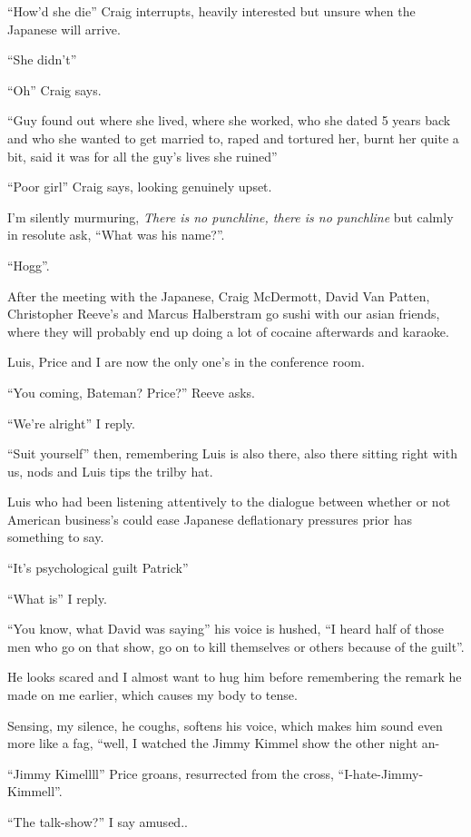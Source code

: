 \documentclass[19pt,openany]{book}
\begin{document}
``How'd she die'' Craig interrupts, heavily
interested but unsure when the Japanese
will arrive.

``She didn't''

``Oh'' Craig says.

``Guy found out where she lived,
where she worked, who she dated 5 years back
and who she wanted to get married to, raped
and tortured her, burnt her quite a bit,
said it was for all the guy's lives she
ruined''

``Poor girl'' Craig says, looking genuinely
upset.

I'm silently murmuring, \textit{There is no punchline, there is no punchline}
but calmly in resolute
ask, ``What was his name?''.

``Hogg''.

After the meeting with the Japanese, Craig
McDermott, David Van Patten, Christopher
Reeve's and Marcus Halberstram go sushi
with our asian friends, where they
will probably end up doing a lot of cocaine
afterwards and karaoke.

Luis, Price and I are now the only one's
in the conference room.

``You coming, Bateman? Price?'' Reeve asks.

``We're alright'' I reply.

``Suit yourself'' then, remembering Luis
is also there, also there sitting
right with us, nods and Luis tips the trilby hat.

Luis who had been listening attentively to the
dialogue between whether or not American business's
could ease Japanese deflationary pressures prior has something
to say.

``It's psychological guilt Patrick''

``What is'' I reply.

``You know, what David was saying'' his voice
is hushed, ``I heard half of those men
who go on that show, go on to kill themselves
or others because of the guilt''.

He looks scared and I almost want to hug
him before remembering the remark he made on
me earlier, which causes my body to tense.

Sensing, my silence, he coughs, softens
his voice, which makes him sound even
more like a fag, ``well, I watched
the Jimmy
Kimmel show the other night an-

``Jimmy Kimellll'' Price groans,
resurrected from the cross, ``I-hate-Jimmy-
Kimmell''.

``The talk-show?'' I say amused..
\end{document}
